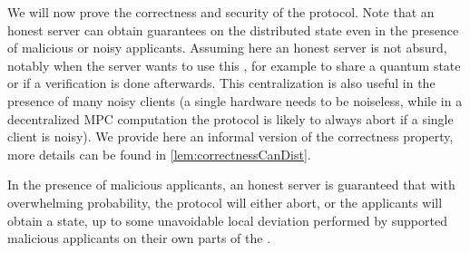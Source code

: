 We will now prove the correctness and security of the \authBlindCanDist{} protocol. Note that an honest server can obtain guarantees on the distributed state even in the presence of malicious or noisy applicants. Assuming here an honest server is not absurd, notably when the server wants to use this \GHZ{}, for example to share a quantum state or if a verification is done afterwards. This centralization is also useful in the presence of many noisy clients (a single hardware needs to be noiseless, while in a decentralized MPC computation the protocol is likely to always abort if a single client is noisy). We provide here an informal version of the correctness property, more details can be found in \cref{lem:correctnessCanDist}.
\begin{lemmaE}
  In the presence of malicious applicants, an honest server is guaranteed that with overwhelming probability, the protocol will either abort, or the applicants will obtain a \GHZ{} state, up to some unavoidable local deviation performed by supported malicious applicants on their own parts of the \GHZ{}.
\end{lemmaE}

